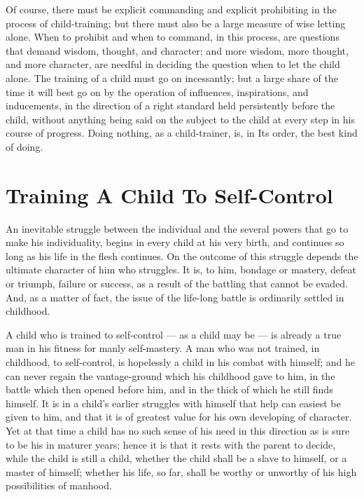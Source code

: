 \documentclass[
]{book}
\begin{document}
Of course, there must be explicit commanding and explicit prohibiting in the process of child-training; but there must also be a large measure of wise letting alone. When to prohibit and when to command, in this process, are questions that demand wisdom, thought, and character; and more wisdom, more thought, and more character, are needful in deciding the question when to let the child alone. The training of a child must go on incessantly; but a large share of the time it will best go on by the operation of influences, inspirations, and inducements, in the direction of a right standard held persistently before the child, without anything being said on the subject to the child at every step in his course of progress. Doing nothing, as a child-trainer, is, in Its order, the best kind of doing.

\hypertarget{training-a-child-to-self-control}{%
\chapter{Training A Child To Self-Control}\label{training-a-child-to-self-control}}

An inevitable struggle between the individual and the several powers that go to make his individuality, begins in every child at his very birth, and continues so long as his life in the flesh continues. On the outcome of this struggle depends the ultimate character of him who struggles. It is, to him, bondage or mastery, defeat or triumph, failure or success, as a result of the battling that cannot be evaded. And, as a matter of fact, the issue of the life-long battle is ordinarily settled in childhood.

A child who is trained to self-control --- as a child may be --- is already a true man in his fitness for manly self-mastery. A man who was not trained, in childhood, to self-control, is hopelessly a child in his combat with himself; and he can never regain the vantage-ground which his childhood gave to him, in the battle which then opened before him, and in the thick of which he still finds himself. It is in a child's earlier struggles with himself that help can easiest be given to him, and that it is of greatest value for his own developing of character. Yet at that time a child has no such sense of his need in this direction as is sure to be his in maturer years; hence it is that it rests with the parent to decide, while the child is still a child, whether the child shall be a slave to himself, or a master of himself; whether his life, so far, shall be worthy or unworthy of his high possibilities of manhood.
\end{document}
